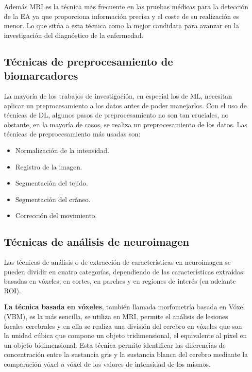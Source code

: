 Además MRI es la técnica más frecuente en las pruebas médicas para la detección de la EA ya que proporciona información
precisa y el coste de su realización es menor.
Lo que sitúa a esta técnica como la mejor candidata para avanzar en la investigación del diagnóstico de la enfermedad.

\subsection{Técnicas de preprocesamiento de biomarcadores}\label{subsec:preprocesamiento-estado-del-arte}
La mayoría de los trabajos de investigación, en especial los de ML, necesitan aplicar un preprocesamiento a los datos
antes de poder manejarlos.
Con el uso de técnicas de DL, algunos pasos de preprocesamiento no son tan cruciales, no obstante, en la mayoría de
casos, se realiza un preprocesamiento de los datos.
Las técnicas de preprocesamiento más usadas son:
\begin{itemize}
    \item Normalización de la intensidad.
    \item Registro de la imagen.
    \item Segmentación del tejido.
    \item Segmentación del cráneo.
    \item Corrección del movimiento.\\
\end{itemize}

\subsection{Técnicas de análisis de neuroimagen}\label{subsec:analisis-de neuroimagen-estado-del-arte}
Las técnicas de análisis o de extracción de características en neuroimagen se pueden dividir en cuatro categorías,
dependiendo de las características extraídas: basadas en vóxeles, en cortes, en parches y en regiones de interés
(en adelante ROI).

\textbf{La técnica basada en vóxeles}, también llamada morfometría basada en Vóxel (VBM), es la más sencilla, se utiliza en MRI,
permite el análisis de lesiones focales cerebrales y en ella se realiza una división del cerebro en vóxeles que son la
unidad cúbica que compone un objeto tridimensional, el equivalente al píxel en un objeto bidimensional.
Esta técnica permite identificar las diferencias de concentración entre la sustancia gris y la sustancia blanca del
cerebro mediante la comparación vóxel a vóxel de los valores de intensidad de los mismos.

